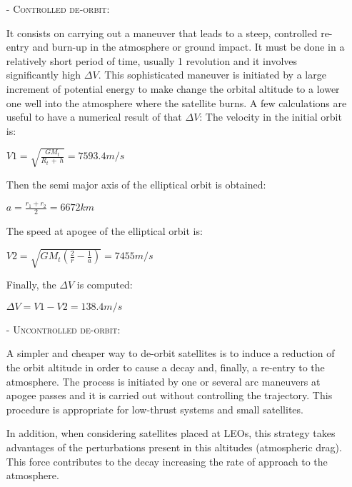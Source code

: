 \begin{itemize}

\item[-] \textsc{Controlled de-orbit:}

It consists on carrying out a maneuver that leads to a steep, controlled re-entry and burn-up in the atmosphere or ground impact. It must be done in a relatively short period of time, usually 1 revolution and it involves significantly high $\Delta V$. This sophisticated maneuver is initiated by a large increment of potential energy to make change the orbital altitude to a lower one well into the atmosphere where the satellite burns. A few calculations are useful to have a numerical result of that  $\Delta V$:
The velocity in the initial orbit is: 

\begin{center}
$V1 = \sqrt{\frac{GM_t}{R_t\,+\,h}}  = 7593.4 m/s$
\end{center}

Then the semi major axis of the elliptical orbit is obtained: 
\begin{center}
$a = {\frac{r_1+r_2}{2}} = 6672 km$
\end{center}

The speed at apogee of the elliptical orbit is: 

\begin{center}
$V2 = \sqrt{GM_t(\frac{2}{r}-\frac{1}{a})} = 7455 m/s$
\end{center}

Finally, the $\Delta V$ is computed: 
\begin{center}
$\Delta V = V1-V2 = 138.4 m/s$
\end{center}

\item[-]  \textsc{Uncontrolled de-orbit:}

A simpler and cheaper way to de-orbit satellites is to induce a reduction of the orbit altitude in order to cause a decay and, finally, a re-entry to the atmosphere. The process is initiated by one or several arc maneuvers at apogee passes and it is carried out without controlling the trajectory. This procedure is appropriate for low-thrust systems and small satellites. 

In addition, when considering satellites placed at LEOs, this strategy takes advantages of the perturbations present in this altitudes (atmospheric drag). This force contributes to the decay increasing the rate of approach to the atmosphere. 

\end{itemize}